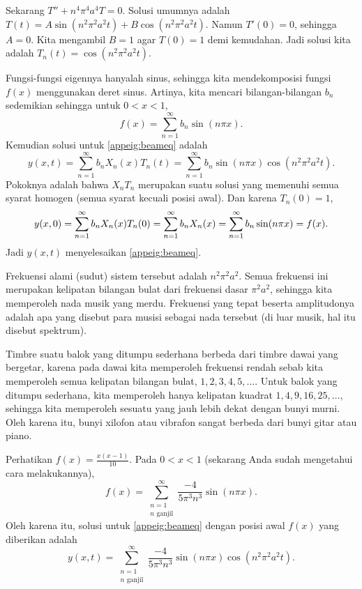 Sekarang 
$T'' + n^4 \pi^4 a^4 T = 0$.  Solusi umumnya adalah $T(t) =
A \sin (n^2 \pi^2 a^2 t) + B \cos (n^2 \pi^2 a^2 t)$.  Namun $T'(0) = 0$, sehingga
$A=0$.  Kita mengambil $B=1$ agar $T(0) = 1$ demi kemudahan.
Jadi solusi kita adalah $T_n(t) = \cos (n^2 \pi^2 a^2 t)$.

Fungsi-fungsi eigennya hanyalah sinus, sehingga kita mendekomposisi fungsi $f(x)$
menggunakan deret sinus.  Artinya,
kita mencari bilangan-bilangan $b_n$ sedemikian sehingga untuk
$0 < x < 1$,
\begin{equation*}
f(x) = \sum_{n=1}^\infty b_n \sin (n \pi x) .
\end{equation*}
Kemudian solusi untuk \eqref{appeig:beameq} adalah
\begin{equation*}
y(x,t) = \sum_{n=1}^\infty b_n
X_n(x) T_n(t)
= \sum_{n=1}^\infty b_n
\sin (n \pi x)  \cos ( n^2 \pi^2 a^2 t ) .
\end{equation*}
Pokoknya adalah bahwa $X_nT_n$ merupakan suatu solusi yang memenuhi semua syarat
homogen (semua syarat kecuali posisi awal).  Dan karena
$T_n(0) = 1$,
\begin{equation*}
y(x,0) = \sum_{n=1}^\infty b_n X_n(x) T_n(0) = 
\sum_{n=1}^\infty b_n X_n(x) =
\sum_{n=1}^\infty b_n
\sin (n \pi x) = f(x) .
\avoidbreak
\end{equation*}
Jadi $y(x,t)$ menyelesaikan \eqref{appeig:beameq}.

Frekuensi alami (sudut) sistem tersebut adalah $n^2 \pi^2 a^2$.
Semua frekuensi ini merupakan kelipatan bilangan bulat dari frekuensi dasar
$\pi^2 a^2$, sehingga kita memperoleh nada musik yang merdu.  Frekuensi yang tepat
beserta amplitudonya
adalah apa yang disebut para musisi sebagai \emph{} nada tersebut (di luar
musik, hal itu disebut spektrum).

Timbre suatu balok yang ditumpu sederhana
berbeda dari timbre dawai yang bergetar, karena pada dawai kita memperoleh 
frekuensi rendah sebab kita memperoleh semua kelipatan bilangan bulat,
$1,2,3,4,5,\ldots$.  Untuk balok yang ditumpu sederhana, kita memperoleh
hanya kelipatan kuadrat $1,4,9,16,25,\ldots$, sehingga
kita memperoleh sesuatu yang jauh lebih dekat dengan bunyi murni.
Oleh karena itu, bunyi xilofon atau vibrafon sangat berbeda dari
bunyi gitar atau piano.

\begin{example}
Perhatikan $f(x) = \frac{x(x-1)}{10}$.  
Pada $0 < x < 1$ (sekarang Anda sudah mengetahui cara melakukannya),
\begin{equation*}
f(x) = \sum_{\substack{n=1\\n \text{~ganjil}}}^\infty \frac{-4}{5\pi^3 n^3}
\sin (n \pi x) .
\end{equation*}
Oleh karena itu, solusi untuk \eqref{appeig:beameq} dengan posisi awal
$f(x)$ yang diberikan adalah
\begin{equation*}
y(x,t) = \sum_{\substack{n=1\\n \text{~ganjil}}}^\infty \frac{-4}{5\pi^3 n^3}
\sin (n \pi x) \cos ( n^2 \pi^2 a^2 t ) .
\end{equation*}
\end{example}

